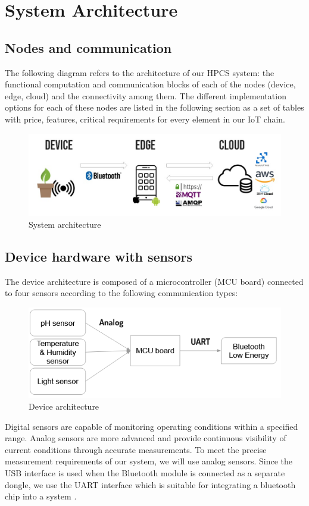 \section{System Architecture}

\subsection{Nodes and communication}
The following diagram refers to the architecture of our HPCS system: the functional computation and communication blocks of each of the nodes (device, edge, cloud)  and the connectivity among them.
The different implementation options for each of these nodes are listed in the following section as a set of tables with price, features, critical requirements for every element in our IoT chain.

\begin{figure}[h]
    \includegraphics[width=\linewidth]{images/system-architecture.jpg}
    \caption{System architecture}
    \label{fig:System architecture}
\end{figure}

\subsection{Device hardware with sensors}
The device architecture is composed of a microcontroller (MCU board) connected to four sensors according to the following communication types: 

\begin{figure}[h]
    \centering
    \includegraphics[width=\linewidth]{images/device-architecture.jpg}
    \caption{Device architecture}
    \label{fig:Device architecture}
\end{figure}

Digital sensors are capable of monitoring operating conditions within a specified range. Analog sensors are more advanced and provide continuous visibility of current conditions through accurate measurements. To meet the precise measurement requirements of our system, we will use analog sensors.
Since the USB interface is used when the Bluetooth module is connected as a separate dongle, we use the UART interface which is suitable for integrating a bluetooth chip into a system \cite{b6}.